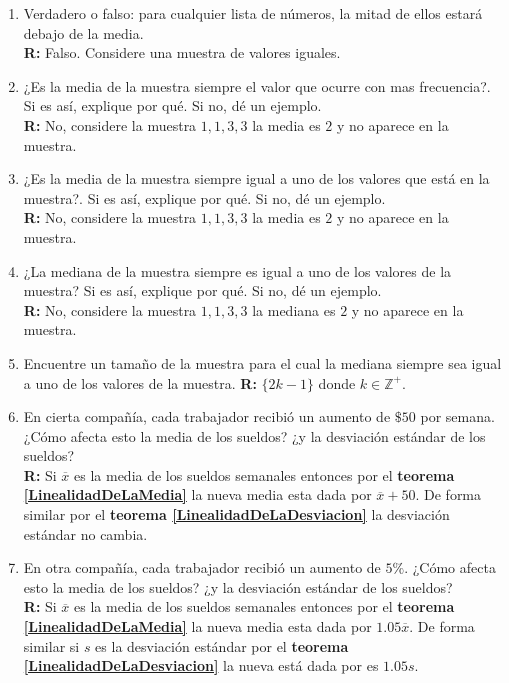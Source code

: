 \documentclass[10pt,a4paper]{book}
\begin{document}
\begin{enumerate}
	\item Verdadero o falso: para cualquier lista de números, la mitad de ellos estará debajo de la media.\\
	\textbf{R:} Falso. Considere una muestra de valores iguales.\\
	
	\item ¿Es la media de la muestra siempre el valor que ocurre con mas frecuencia?. Si es así, explique por qué. Si no, dé un ejemplo.\\
	\textbf{R:} No, considere la muestra $ 1,1,3,3 $ la media es $2$ y no aparece en la muestra.\\
	
	\item ¿Es la media de la muestra siempre igual a uno de los valores que está en la muestra?. Si es así, explique por qué. Si no, dé un ejemplo.\\
	\textbf{R:} No, considere la muestra $ 1,1,3,3 $ la media es $2$ y no aparece en la muestra.\\
	
	\item ¿La mediana de la muestra siempre es igual a uno de los valores de la muestra? Si es así, explique por qué. Si no, dé un ejemplo.\\
	\textbf{R:} No, considere la muestra $ 1,1,3,3 $ la mediana es $2$ y no aparece en la muestra.\\
	
	\item Encuentre un tamaño de la muestra para el cual la mediana siempre sea igual a uno de los valores de la muestra.
	\textbf{R:} $ \{2 k - 1 \} $ donde $ k \in \mathbb{Z}^+ $.\\
	
	\item En cierta compañía, cada trabajador recibió un aumento de $ \$50 $ por semana. ¿Cómo afecta esto la media de los sueldos? ¿y la desviación estándar de los sueldos?\\
	\textbf{R:} Si $ \overline{x} $ es la media de los sueldos semanales entonces por el \textbf{teorema \ref{LinealidadDeLaMedia}} la nueva media esta dada por $\overline{x} + 50 $. De forma similar por el \textbf{teorema \ref{LinealidadDeLaDesviacion}} la desviación estándar no cambia.\\
	
	\item En otra compañía, cada trabajador recibió un aumento de $ 5\% $. ¿Cómo afecta esto la media de los sueldos? ¿y la desviación estándar de los sueldos?\\
	\textbf{R:} Si $ \overline{x} $ es la media de los sueldos semanales entonces por el \textbf{teorema \ref{LinealidadDeLaMedia}} la nueva media esta dada por $1.05\overline{x}$. De forma similar si $s$ es la desviación estándar por el \textbf{teorema \ref{LinealidadDeLaDesviacion}} la nueva está dada por es $ 1.05s $.\\
	

\end{enumerate}
\end{document}
